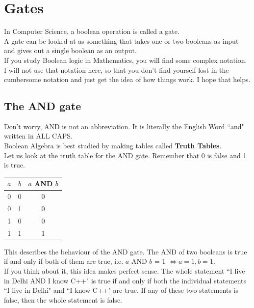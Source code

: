 \documentclass[letterpaper, 12pt]{book}
\begin{document}
\section{Gates}
In Computer Science, a boolean operation is called a gate.\\
A gate can be looked at as something that takes one or two booleans as input and gives out a single boolean as an output.\\
If you study Boolean logic in Mathematics, you will find some complex notation. I will not use that notation here, so that you don't find yourself lost in the cumbersome notation and just get the idea of how things work. I hope that helps.
\subsection{The AND gate}
Don't worry, AND is not an abbreviation. It is literally the English Word ``and" written in ALL CAPS.\\
Boolean Algebra is best studied by making tables called \textbf{Truth Tables}.\\
Let us look at the truth table for the AND gate. Remember that 0 is false and 1 is true.
\begin{center}
	\begin{tabular}{ |c|c|c| } 
		\hline
		$a$ & $b$ & $a$ AND $b$ \\ 
		\hline
		0 & 0 & 0 \\ 
		0 & 1 & 0 \\
		1 & 0 & 0 \\
		1 & 1 & 1 \\
		\hline
	\end{tabular}
\end{center}
This describes the behaviour of the AND gate. The AND of two booleans is true if and only if both of them are true, i.e. $a$ AND $b$ = 1 $\Leftrightarrow a = 1, b = 1$.\\
If you think about it, this idea makes perfect sense. The whole statement ``I live in Delhi AND I know C++" is true if and only if both the individual statements ``I live in Delhi" and ``I know C++" are true. If any of these two statements is false, then the whole statement is false.
\end{document}
